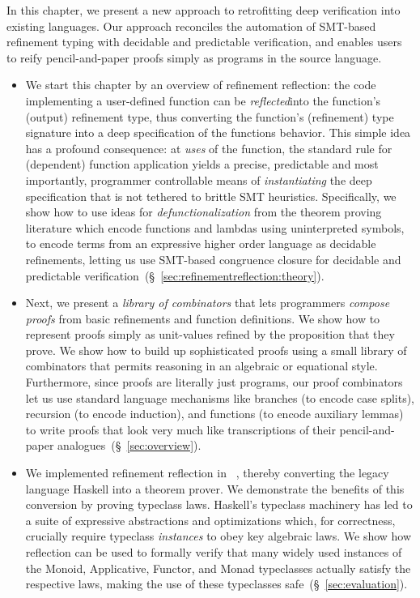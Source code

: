 In this chapter, we present a new approach to retrofitting
deep verification into existing languages. Our approach
reconciles the automation of SMT-based refinement typing
with decidable and predictable verification, and enables
users to reify pencil-and-paper proofs simply
as programs in the source language.
\begin{itemize}
\item %
%
We start this chapter by an overview of 
refinement reflection: the code
implementing a​ user-defined function can
be \emph{reflected}​ into the function's
(output) refinement type, thus converting
the function's (refinement) type signature
into a deep specification of the functions
behavior.
%
This simple idea has a profound consequence:
at \emph{uses} of the function, the standard
rule for (dependent) function application
yields a precise, predictable and most
importantly, programmer controllable
means of \emph{instantiating} the deep
specification that is not tethered to
brittle SMT heuristics.
%
Specifically, we show how to use ideas for
\emph{defunctionalization} from the theorem
proving literature which encode functions
and lambdas using uninterpreted symbols,
to encode terms from an expressive higher
order language as decidable refinements,
letting us use SMT-based congruence
closure for decidable and predictable
verification~(\S~\ref{sec:refinementreflection:theory}).

\item %
%
Next, we present a
\emph{library of combinators}
that lets programmers
\emph{compose proofs}
from basic refinements
and function definitions.
%
We show how to represent proofs
simply as unit-values refined
by the proposition that
they prove. %
%
We show how to build up sophisticated proofs
using a small library of combinators that
permits reasoning in an algebraic or
equational style.
%
Furthermore, since proofs are literally
just programs, our proof combinators let
us use standard language mechanisms like
branches (to encode case splits),
recursion (to encode induction), and
functions (to encode auxiliary lemmas)
to write proofs that look very much like
transcriptions of their pencil-and-paper
analogues~(\S~\ref{sec:overview}).

\item %
%
We implemented refinement reflection in \toolname~\citep{Vazou14},
thereby converting the legacy language
Haskell into a theorem prover.
%
We demonstrate the benefits of this conversion
by proving typeclass laws.
%
Haskell's typeclass machinery has led to
a suite of expressive abstractions and optimizations
which, for correctness, crucially require
typeclass \emph{instances} to obey key algebraic laws.
We show how reflection can be used to formally verify
that many widely used instances of the Monoid, Applicative,
Functor, and Monad typeclasses actually satisfy the
respective laws, making the use of these typeclasses safe~(\S~\ref{sec:evaluation}).


\end{itemize}
